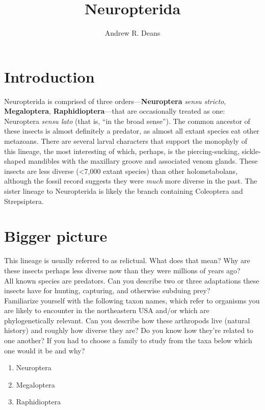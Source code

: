 \documentclass[letterpaper, 11pt]{article}
\title{Neuropterida}
\author{Andrew R. Deans}
\begin{document}
\cleanlookdateon %
\maketitle
\thispagestyle{fancy}
\section*{Introduction}
Neuropterida is comprised of three orders---\textbf{Neuroptera} \textit{sensu stricto}, \textbf{Megaloptera}, \textbf{Raphidioptera}---that are occasionally treated as one: Neuroptera \textit{sensu lato} (that is, ``in the broad sense''). The common ancestor of these insects is almost definitely a predator, as almost all extant species eat other metazoans. There are several larval characters that support the monophyly of this lineage, the most interesting of which, perhaps, is the piercing-sucking, sickle-shaped mandibles with the maxillary groove and associated venom glands. These insects are less diverse (\textless7,000 extant species) than other holometabolans, although the fossil record suggests they were \textit{much} more diverse in the past. The sister lineage to Neuropterida is likely the branch containing Coleoptera and Strepsiptera.

\section*{Bigger picture}
This lineage is usually referred to as relictual. What does that mean? Why are these insects perhaps less diverse now than they were millions of years ago?\\

\noindent{}All known species are predators. Can you describe two or three adaptations these insects have for hunting, capturing, and otherwise subduing prey?\\

\noindent{}Familiarize yourself with the following taxon names, which refer to organisms you are likely to encounter in the northeastern USA and/or which are phylogenetically relevant. Can you describe how these arthropods live (natural history) and roughly how diverse they are? Do you know how they're related to one another? If you had to choose a family to study from the taxa below which one would it be and why?
\begin{enumerate} 
\item Neuroptera  
\item Megaloptera
\item Raphidioptera
\end{enumerate}
\end{document}
